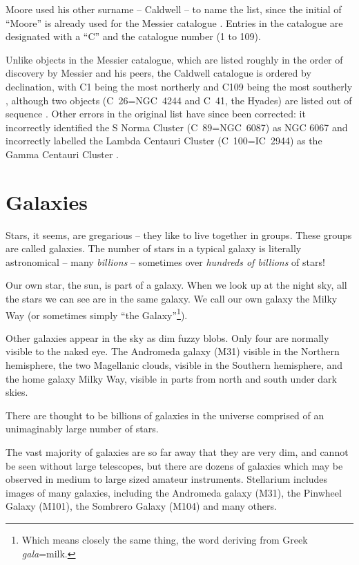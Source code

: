 Moore used his other surname -- Caldwell -- to name the list, since
the initial of ``Moore'' is already used for the Messier catalogue
\citep{SJOMeara:2003}. Entries in the catalogue are designated with a
``C'' and the catalogue number (1 to 109).

Unlike objects in the Messier catalogue, which are listed roughly in
the order of discovery by Messier and his peers, the Caldwell
catalogue is ordered by declination, with C1 being the most northerly
and C109 being the most southerly \citep{SJOMeara:2003}, although two
objects (C~26=NGC~4244 and C~41, the Hyades) are listed out of
sequence \citep{SJOMeara:2003}. Other errors in the original list have
since been corrected: it incorrectly identified the S Norma Cluster
(C~89=NGC~6087) as NGC 6067 and incorrectly labelled the Lambda
Centauri Cluster (C~100=IC~2944) as the Gamma Centauri Cluster
\citep{SJOMeara:2003}.

\section{Galaxies}
\label{sec:Phenomena:Galaxies}

Stars, it seems, are gregarious -- they like to live together in groups.
These groups are called galaxies. The number of stars in a typical
galaxy is literally astronomical -- many \emph{billions} -- sometimes over
\emph{hundreds of billions} of stars!

Our own star, the sun, is part of a galaxy. When we look up at the
night sky, all the stars we can see are in the same galaxy. We call
our own galaxy the Milky Way (or sometimes simply ``the
Galaxy''\footnote{Which means closely the same thing, the word
  deriving from Greek \emph{gala}=milk.}).

Other galaxies appear in the sky as dim fuzzy blobs. Only four are
normally visible to the naked eye. The Andromeda galaxy (M31) visible in
the Northern hemisphere, the two Magellanic clouds, visible in the
Southern hemisphere, and the home galaxy Milky Way, visible in parts
from north and south under dark skies.

There are thought to be billions of galaxies in the universe comprised
of an unimaginably large number of stars.

The vast majority of galaxies are so far away that they are very dim,
and cannot be seen without large telescopes, but there are dozens of
galaxies which may be observed in medium to large sized amateur
instruments. Stellarium includes images of many galaxies, including the
Andromeda galaxy (M31), the Pinwheel Galaxy (M101), the Sombrero Galaxy
(M104) and many others.

